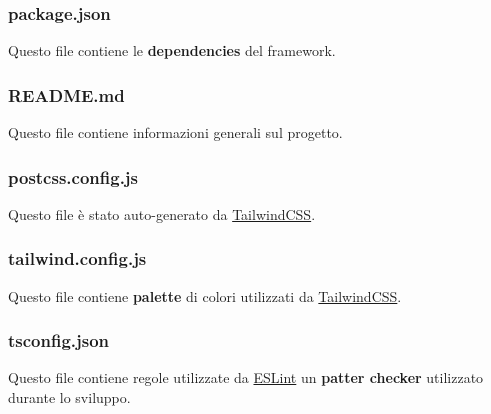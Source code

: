 \documentclass[11pt, a4paper]{article}
\theoremstyle{definition}
\begin{document}
\subsubsection{package.json}
Questo file contiene le \textbf{dependencies} del framework.
\subsubsection{README.md}
Questo file contiene informazioni generali sul progetto.
\subsubsection{postcss.config.js}
Questo file è stato auto-generato da \href{https://tailwindcss.com/}{TailwindCSS}.
\subsubsection{tailwind.config.js}
Questo file contiene \textbf{palette} di colori utilizzati da \href{https://tailwindcss.com/}{TailwindCSS}.
\subsubsection{tsconfig.json}
Questo file contiene regole utilizzate da \href{https://eslint.org/}{ESLint} un \textbf{patter checker} utilizzato durante lo sviluppo.
  
\end{document}
